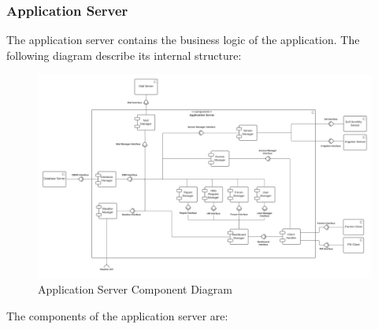 \documentclass[10pt]{article} %
\begin{document}
\subsubsection{Application Server}
The application server contains the business logic of the application. The following diagram describe its internal structure:
\begin{figure}[h]
    \centering 
    \includegraphics[scale=0.38]{images/app_server_component.png}
    \caption{Application Server Component Diagram}
    \label{fig:app_component}
\end{figure}
The components of the application server are:
\end{document}

